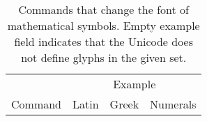 \begin{table}
  \ExplSyntaxOn

  \NewDocumentCommand{\GStr}{}{
    \Alpha\Beta\Gamma\alpha\beta\gamma\ \ldots}
  \ExplSyntaxOff
  \caption{Commands that change the font of mathematical symbols. Empty
    example field indicates that the Unicode does not define glyphs in the
    given set.}\label{tbl:sym_commands}
  \begin{minipage}{\linewidth}
    \centering
    \begin{tabular}{@{}*4l@{}}
      \toprule
                      & \multicolumn{3}{c}{Example}                                                           \\
      \cmidrule(l){2-4}
      Command         & Latin                        & Greek                          & Numerals              \\
      \midrule


\end{tabular}
\end{minipage}
\end{table}
